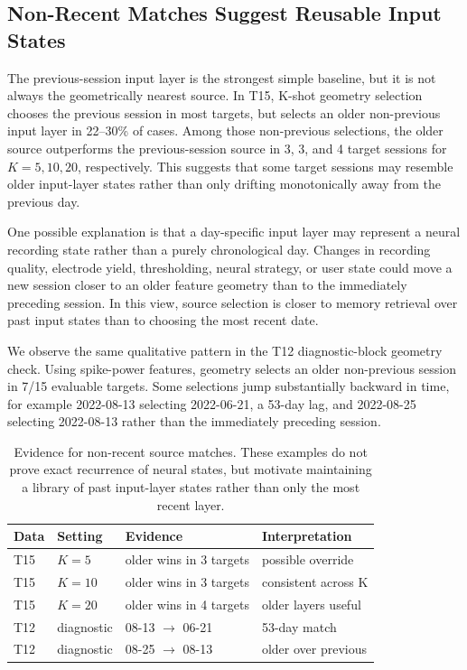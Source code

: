 \documentclass{article}
\begin{document}
\subsection{Non-Recent Matches Suggest Reusable Input States}
The previous-session input layer is the strongest simple baseline, but it is not always the geometrically nearest source. In T15, K-shot geometry selection chooses the previous session in most targets, but selects an older non-previous input layer in 22--30\% of cases. Among those non-previous selections, the older source outperforms the previous-session source in 3, 3, and 4 target sessions for $K=5,10,20$, respectively. This suggests that some target sessions may resemble older input-layer states rather than only drifting monotonically away from the previous day.

One possible explanation is that a day-specific input layer may represent a neural recording state rather than a purely chronological day. Changes in recording quality, electrode yield, thresholding, neural strategy, or user state could move a new session closer to an older feature geometry than to the immediately preceding session. In this view, source selection is closer to memory retrieval over past input states than to choosing the most recent date.

We observe the same qualitative pattern in the T12 diagnostic-block geometry check. Using spike-power features, geometry selects an older non-previous session in 7/15 evaluable targets. Some selections jump substantially backward in time, for example 2022-08-13 selecting 2022-06-21, a 53-day lag, and 2022-08-25 selecting 2022-08-13 rather than the immediately preceding session.

\begin{table}[t]
\centering
\caption{Evidence for non-recent source matches. These examples do not prove exact recurrence of neural states, but motivate maintaining a library of past input-layer states rather than only the most recent layer.}
\scriptsize
\begin{tabular}{llll}
\toprule
Data & Setting & Evidence & Interpretation \\
\midrule
T15 & $K=5$ & older wins in 3 targets & possible override \\
T15 & $K=10$ & older wins in 3 targets & consistent across K \\
T15 & $K=20$ & older wins in 4 targets & older layers useful \\
T12 & diagnostic & 08-13 $\rightarrow$ 06-21 & 53-day match \\
T12 & diagnostic & 08-25 $\rightarrow$ 08-13 & older over previous \\
\bottomrule
\end{tabular}
\label{tab:nonrecent}
\end{table}
\end{document}
